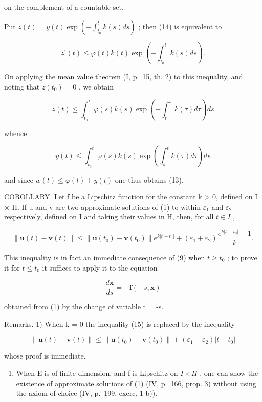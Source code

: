 on the complement of a countable set.

Put \(z(t) = y(t)\exp \left(-\int_{t_0}^t k(s)ds\right)\) ; then (14) is equivalent to

\[
z ^ {\prime} (t) \leqslant \varphi (t) k (t) \exp \left(- \int_ {t _ {0}} ^ {t} k (s) d s\right).
\]

On applying the mean value theorem (I, p.~15, th. 2) to this inequality, and noting that \(z(t_0) = 0\) , we obtain

\[
z (t) \leqslant \int_ {t _ {0}} ^ {t} \varphi (s) k (s) \exp \left(- \int_ {t _ {0}} ^ {s} k (\tau) d \tau\right) d s
\]

whence

\[
y (t) \leqslant \int_ {t _ {0}} ^ {t} \varphi (s) k (s) \exp \left(\int_ {s} ^ {t} k (\tau) d \tau\right) d s
\]

and since \(w(t) \leqslant \varphi(t) + y(t)\) one thus obtains (13).

COROLLARY. Let f be a Lipschitz function for the constant k \textgreater{} 0, defined on I × H. If u and v are two approximate solutions of (1) to within \(\varepsilon_{1}\) and \(\varepsilon_{2}\) respectively, defined on I and taking their values in H, then, for all \(t \in I\) ,

\[
\| \mathbf {u} (t) - \mathbf {v} (t) \| \leqslant \| \mathbf {u} (t _ {0}) - \mathbf {v} (t _ {0}) \| e ^ {k | t - t _ {0} |} + (\varepsilon_ {1} + \varepsilon_ {2}) \frac {e ^ {k | t - t _ {0} |} - 1}{k}.\tag{15}
\]

This inequality is in fact an immediate consequence of (9) when \(t \geqslant t_0\) ; to prove it for \(t \leqslant t_0\) it suffices to apply it to the equation

\[
{\frac {d \mathbf {x}}{d s}} = - \mathbf {f} (- s, \mathbf {x})
\]

obtained from (1) by the change of variable t = -s.

Remarks. 1) When k = 0 the inequality (15) is replaced by the inequality

\[
\left\| \mathbf {u} (t) - \mathbf {v} (t) \right\| \leqslant \left\| \mathbf {u} \left(t _ {0}\right) - \mathbf {v} \left(t _ {0}\right) \right\| + \left(\varepsilon_ {1} + \varepsilon_ {2}\right) | t - t _ {0} |
\]

whose proof is immediate.

\begin{enumerate}
\def\labelenumi{\arabic{enumi})}
\setcounter{enumi}{1}
\tightlist
\item
  When E is of finite dimension, and f is Lipschitz on \(I \times H\) , one can show the existence of approximate solutions of (1) (IV, p.~166, prop. 3) without using the axiom of choice (IV, p.~199, exerc. 1 b)).
\end{enumerate}

